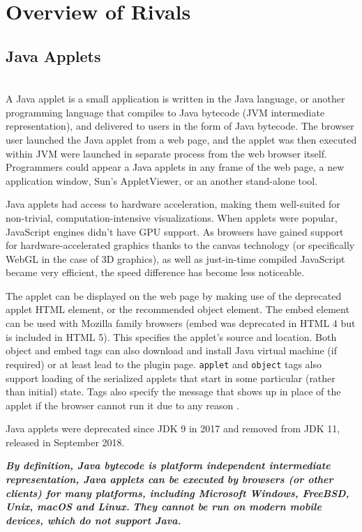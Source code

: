 \section{Overview of Rivals}
\subsection{Java Applets} \mbox{}\\
\indent A Java applet is a small application is written in the Java language, or another programming language that compiles to Java bytecode (JVM intermediate representation), and delivered to users in the form of Java bytecode. 
The browser user launched the Java applet from a web page, and the applet was then executed within JVM were launched in separate process from the web browser itself. 
Programmers could appear a Java applets in any frame of the web page, a new application window, Sun's AppletViewer, or an another stand-alone tool.

Java applets had access to hardware acceleration, making them well-suited for non-trivial, computation-intensive visualizations. When applets were popular, JavaScript engines didn't have GPU support.
As browsers have gained support for hardware-accelerated graphics thanks to the canvas technology (or specifically WebGL in the case of 3D graphics), 
as well as just-in-time compiled JavaScript became very efficient, the speed difference has become less noticeable.

The applet can be displayed on the web page by making use of the deprecated applet HTML element, or the recommended object element.
The embed element can be used with Mozilla family browsers (embed was deprecated in HTML 4 but is included in HTML 5). 
This specifies the applet's source and location. 
Both object and embed tags can also download and install Java virtual machine (if required) or at least lead to the plugin page. 
\texttt{applet} and \texttt{{object}} tags also support loading of the serialized applets that start in some particular (rather than initial) state. 
Tags also specify the message that shows up in place of the applet if the browser cannot run it due to any reason \cite{Wiki_Applet}.

Java applets were deprecated since JDK 9 in 2017 and removed from JDK 11, released in September 2018.

\textit{\textbf{By definition, Java bytecode is platform independent intermediate representation, Java applets can be executed by browsers (or other clients) for many platforms, including Microsoft Windows, FreeBSD, Unix, macOS and Linux.}}
\textit{\textbf{They cannot be run on modern mobile devices, which do not support Java.}}

